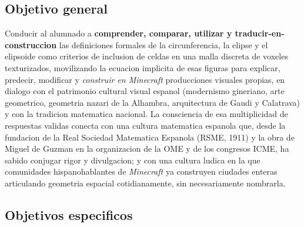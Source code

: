 \documentclass[12pt,a4paper]{scrartcl}
\newcommand{\acc}[1]{\textcolor{accent}{\textbf{#1}}}
\begin{document}
\subsection{Objetivo general}

Conducir al alumnado a \acc{comprender, comparar, utilizar y traducir-en-construccion} las definiciones formales de la circunferencia, la elipse y el elipsoide como criterios de inclusion de celdas en una malla discreta de voxeles texturizados, movilizando la ecuacion implicita de esas figuras para explicar, predecir, modificar y \emph{construir en Minecraft} producciones visuales propias, en dialogo con el patrimonio cultural visual espanol (modernismo gineriano, arte geometrico, geometria nazari de la Alhambra, arquitectura de Gaudi y Calatrava) y con la tradicion matematica nacional. La consciencia de esa multiplicidad de respuestas validas conecta con una cultura matematica espanola que, desde la fundacion de la Real Sociedad Matematica Espanola (RSME, 1911) y la obra de Miguel de Guzman en la organizacion de la OME y de los congresos ICME, ha sabido conjugar rigor y divulgacion; y con una cultura ludica en la que comunidades hispanohablantes de \emph{Minecraft} ya construyen ciudades enteras articulando geometria espacial cotidianamente, sin necesariamente nombrarla.

\subsection{Objetivos especificos}
\end{document}
